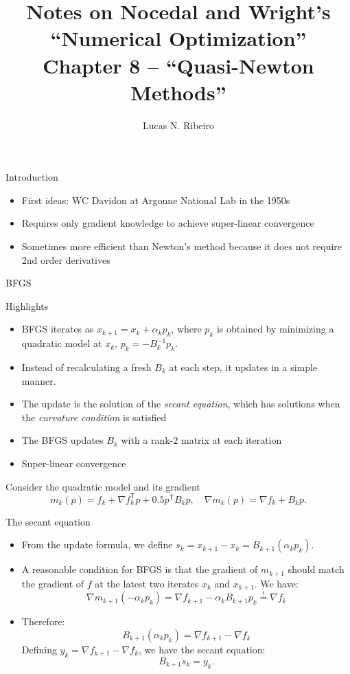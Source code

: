 \documentclass{beamer}
\title[Chapter 7]{Notes on Nocedal and Wright's ``Numerical Optimization''\\Chapter 8 --  ``Quasi-Newton Methods''}
\author{Lucas N. Ribeiro}
\date{}
\newcommand{\tran}{\mathsf{T}}
\begin{document}
 
\frame{\titlepage}
 
\begin{frame}[allowframebreaks]{Introduction}
	\begin{itemize}
		\item First ideas: WC Davidon at Argonne National Lab in the 1950s
		\item Requires only gradient knowledge to achieve super-linear convergence
		\item Sometimes more efficient than Newton's method because it does not require 2nd order derivatives
	\end{itemize}
\end{frame}

\begin{frame}[allowframebreaks]{BFGS}
	\begin{block}{Highlights}
		\begin{itemize}
			\item BFGS iterates as $x_{k+1} = x_k + \alpha_k p_k$, where $p_k$ is obtained by minimizing a quadratic model at $x_k$, $p_k = -B_k^{-1}p_k$.
			\item Instead of recalculating a fresh $B_k$ at each step, it updates in a simple manner.
			\item The update is the solution of the \emph{secant equation}, which has solutions when the \emph{curvature condition} is satisfied
			\item The BFGS updates $B_k$ with a rank-$2$ matrix at each iteration
			\item Super-linear convergence
		\end{itemize}
	\end{block}

	Consider the quadratic model and its gradient
	\[
	m_k(p)= f_k + \nabla f_k^\tran p + 0.5 p^\tran B_k p,\quad \nabla m_k(p) = \nabla f_k + B_k p.
	\]

	\newpage
	\begin{block}{The secant equation}
		\begin{itemize}
			\item From the update formula, we define $s_k = x_{k+1} - x_k = B_{k+1} (\alpha_k p_k)$.
			\item A reasonable condition for BFGS is that the gradient of $m_{k+1}$ should match the gradient of $f$ at the latest two iterates $x_k$ and $x_{k+1}$. We have:
			\[
				\nabla m_{k+1}(-\alpha_k p_k) = \nabla f_{k+1} - \alpha_k B_{k+1} p_k \stackrel{!}{=} \nabla f_k
			\]
			\item Therefore:
			\[
				B_{k+1}(\alpha_k p_k) = \nabla f_{k+1} - \nabla f_k
			\]
			Defining $y_k=\nabla f_{k+1} - \nabla f_k$, we have the secant equation:
			\[
				B_{k+1} s_k = y_k.
			\]
		\end{itemize}
	\end{block}


\end{frame}
\end{document}
